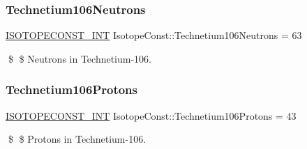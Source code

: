 \subsubsection{\texorpdfstring{Technetium106\+Neutrons}{Technetium106Neutrons}}
{\footnotesize\ttfamily \mbox{\hyperlink{group___isotope_const-_macros_ga5f18360b3e99483a35c32d789e62621c}{I\+S\+O\+T\+O\+P\+E\+C\+O\+N\+S\+T\+\_\+\+I\+NT}} Isotope\+Const\+::\+Technetium106\+Neutrons = 63}

\$ \$ Neutrons in Technetium-\/106. \mbox{\label{group___isotope_const-_technetium-_tc106_gacbabcc4b3b0c4945b63b686dc7c48149}} 
\subsubsection{\texorpdfstring{Technetium106\+Protons}{Technetium106Protons}}
{\footnotesize\ttfamily \mbox{\hyperlink{group___isotope_const-_macros_ga5f18360b3e99483a35c32d789e62621c}{I\+S\+O\+T\+O\+P\+E\+C\+O\+N\+S\+T\+\_\+\+I\+NT}} Isotope\+Const\+::\+Technetium106\+Protons = 43}

\$ \$ Protons in Technetium-\/106. 